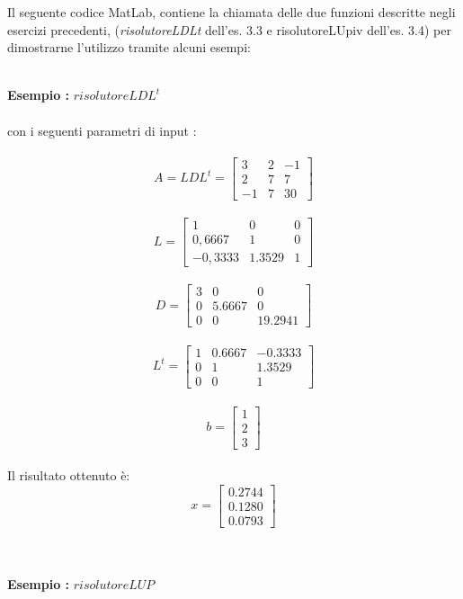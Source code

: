 Il seguente codice MatLab, contiene la chiamata delle due funzioni descritte negli esercizi precedenti, (\textit{risolutoreLDLt}  dell'es. 3.3 e risolutoreLUpiv dell'es. 3.4) per dimostrarne l'utilizzo tramite alcuni esempi:\\\

\begin{description}
\item \textbf{Esempio :} \textit{$risolutoreLDL^t$}\\\\
	con i seguenti parametri di input :\\\	 
	\[
	A = LDL^t =\begin{bmatrix}
		 3 & 2 & -1 \\ 
		 2 & 7 &  7 \\
		-1 & 7 & 30 
	\end{bmatrix}
	\]\\
	\[
	L =\begin{bmatrix}
		   1   &   0    & 0 \\ 
		0,6667 &   1    & 0 \\
	   -0,3333 & 1.3529 & 1 
	\end{bmatrix}
	\]\\ 
	\[
	D =\begin{bmatrix}
		3 &   0    &   0    \\ 
		0 & 5.6667 &   0    \\
		0 &   0    & 19.2941 
	\end{bmatrix}
	\]\\ 
	\[
	L^t =\begin{bmatrix}
		1 & 0.6667 & -0.3333 \\ 
		0 &    1   &  1.3529 \\
		0 &    0   &    1 
	\end{bmatrix}
	\]\\
	\[
	b =\begin{bmatrix}
		1 \\
		2 \\
		3                
	\end{bmatrix}
	\]\\	
	Il risultato ottenuto è:\\
	\[
	x =\begin{bmatrix}
		0.2744 \\
		0.1280 \\
		0.0793                
	\end{bmatrix}
	\]\\\\
\item \textbf{Esempio :} \textit{$risolutoreLUP$}\\\\	

\end{description}
